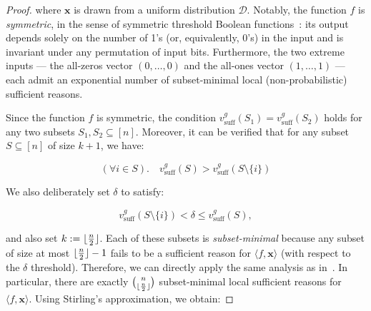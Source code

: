 \documentclass{article}
\DeclarePairedDelimiter\floor{\lfloor}{\rfloor}
\newcommand{\x}{\textbf{x}}
\begin{document}
\begin{proof}
where $\x$ is drawn from a uniform distribution $\mathcal{D}$.
Notably, the function $f$ is \emph{symmetric}, in the sense of symmetric threshold Boolean functions~\cite{wegener2005complexity}: its output depends solely on the number of 1's (or, equivalently, 0's) in the input and is invariant under any permutation of input bits.
Furthermore, the two extreme inputs --- the all-zeros vector $(0,\dots,0)$ and the all-ones vector $(1,\dots,1)$ --- each admit an exponential number of subset-minimal local (non-probabilistic) sufficient reasons.



Since the function $f$ is symmetric, the condition
$v^{g}_{\text{suff}}(S_{1}) = v^{g}_{\text{suff}}(S_{2})$
holds for any two subsets $S_1, S_2 \subseteq [n]$.
Moreover, it can be verified that for any subset $S \subseteq [n]$ of size $k+1$, we have:

%
\begin{equation}
    (\forall i\in S). \quad v^{g}_{\text{suff}}(S) > v^{g}_{\text{suff}}(S\setminus\{i\})
\end{equation}



We also deliberately set $\delta$ to satisfy:

    
\begin{equation}
v^{g}_{\text{suff}}(S\setminus\{i\}) < \delta \le v^{g}_{\text{suff}}(S),
\end{equation}

and also set $k:=\floor{\frac{n}{2}}$. Each of these subsets is \emph{subset-minimal} because any subset of size at most $\floor{\frac{n}{2}} - 1$ fails to be a sufficient reason for $\langle f, \x \rangle$ (with respect to the $\delta$ threshold). Therefore, we can directly apply the same analysis as in~\citep{bassanlocal}. In particular, there are exactly $\binom{n}{\floor{\frac{n}{2}}}$ subset-minimal local sufficient reasons for $\langle f, \x \rangle$. Using Stirling's approximation, we obtain:


\end{proof}
\end{document}
